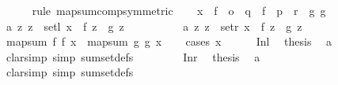 \begin{isabellebody}
\ \ \ \ \isamarkupfalse%
\ {\isacharparenleft}{\kern0pt}rule\ map{\isacharunderscore}{\kern0pt}sum{\isachardot}{\kern0pt}comp{\isacharbrackleft}{\kern0pt}symmetric{\isacharbrackright}{\kern0pt}{\isacharparenright}{\kern0pt}\isanewline
{}\isamarkupfalse%
\isanewline
\ \ \isamarkupfalse%
\ x\ \ f{}\ {\isacharcolon}{\kern0pt}{\isacharcolon}{\kern0pt}\ {\isachardoublequoteopen}{\isacharprime}{\kern0pt}o\ {\isasymRightarrow}\ {\isacharprime}{\kern0pt}q{\isachardoublequoteclose}\ \ f{}\ {\isacharcolon}{\kern0pt}{\isacharcolon}{\kern0pt}\ {\isachardoublequoteopen}{\isacharprime}{\kern0pt}p\ {\isasymRightarrow}\ {\isacharprime}{\kern0pt}r{\isachardoublequoteclose}\ \ g{}\ g{}\isanewline
\ \ \isamarkupfalse%
\ a{}{\isacharcolon}{\kern0pt}\ {\isachardoublequoteopen}{\isasymAnd}z{\isachardot}{\kern0pt}\ z\ {\isasymin}\ setl\ x\ {\isasymLongrightarrow}\ f{}\ z\ {\isacharequal}{\kern0pt}\ g{}\ z{\isachardoublequoteclose}\ \isanewline
\ \ \ \ \ \ \ \ \ a{}{\isacharcolon}{\kern0pt}\ {\isachardoublequoteopen}{\isasymAnd}z{\isachardot}{\kern0pt}\ z\ {\isasymin}\ setr\ x\ {\isasymLongrightarrow}\ f{}\ z\ {\isacharequal}{\kern0pt}\ g{}\ z{\isachardoublequoteclose}\isanewline
\ \ \isamarkupfalse%
\ {\isachardoublequoteopen}map{\isacharunderscore}{\kern0pt}sum\ f{}\ f{}\ x\ {\isacharequal}{\kern0pt}\ map{\isacharunderscore}{\kern0pt}sum\ g{}\ g{}\ x{\isachardoublequoteclose}\isanewline
\ \ \isamarkupfalse%
\ {\isacharparenleft}{\kern0pt}cases\ x{\isacharparenright}{\kern0pt}\isanewline
\ \ \ \ \isamarkupfalse%
\ Inl\ \isamarkupfalse%
\ {\isacharquery}{\kern0pt}thesis\ \isamarkupfalse%
\ a{}\ \isamarkupfalse%
\ {\isacharparenleft}{\kern0pt}clarsimp\ simp{\isacharcolon}{\kern0pt}\ sum{\isacharunderscore}{\kern0pt}set{\isacharunderscore}{\kern0pt}defs{\isacharparenleft}{\kern0pt}{}{\isacharparenright}{\kern0pt}{\isacharparenright}{\kern0pt}\isanewline
\ \ \isamarkupfalse%
\isanewline
\ \ \ \ \isamarkupfalse%
\ Inr\ \isamarkupfalse%
\ {\isacharquery}{\kern0pt}thesis\ \isamarkupfalse%
\ a{}\ \isamarkupfalse%
\ {\isacharparenleft}{\kern0pt}clarsimp\ simp{\isacharcolon}{\kern0pt}\ sum{\isacharunderscore}{\kern0pt}set{\isacharunderscore}{\kern0pt}defs{\isacharparenleft}{\kern0pt}{}{\isacharparenright}{\kern0pt}{\isacharparenright}{\kern0pt}\isanewline

\end{isabellebody}
